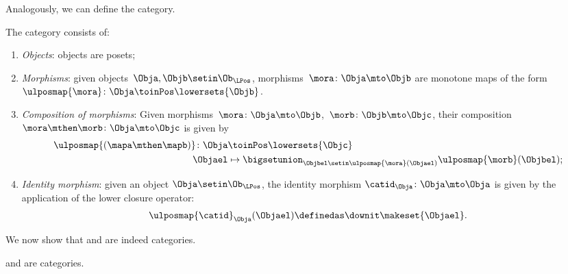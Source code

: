 Analogously, we can define the \LPos category.
\begin{definition}
    \label{def:lpos_cat}
    The category \LPos consists of:
    \begin{enumerate}
        \item \emph{Objects}: objects are posets;
        \item \emph{Morphisms}: given objects~$\Obja,\Objb\setin \Ob_{\LPos}$, morphisms~$\mora\colon \Obja\mto \Objb$ are monotone maps of the form~$\ulposmap{\mora} \colon \Obja \toinPos \lowersets{\Objb}$.
        \item \emph{Composition of morphisms}: Given morphisms~$\mora \colon \Obja \mto \Objb$,~$\morb \colon \Objb\mto \Objc$, their composition~$\mora\mthen \morb\colon \Obja\mto \Objc$ is given by
              \begin{equation}
                  \begin{aligned}
                      \ulposmap{(\mapa \mthen \mapb)} \colon \Obja & \toinPos \lowersets{\Objc} \\
                      \Objael                                      & \mapsto \bigsetunion_{\Objbel\setin \ulposmap{\mora} (\Objael)}\ulposmap{\morb}(\Objbel);
                  \end{aligned}
              \end{equation}
        \item \emph{Identity morphism}: given an object $\Obja\setin \Ob_{\LPos}$, the identity morphism $\catid_\Obja \colon \Obja \mto \Obja$ is given by the application of the lower closure operator:
              \begin{equation}
                  \ulposmap{\catid}_\Obja(\Objael)\definedas \downit\makeset{\Objael}.
              \end{equation}
    \end{enumerate}
\end{definition}

We now show that \UPos and \LPos are indeed categories.

\begin{lemma}
    \label{lem:upos_lpos_cats}
    \UPos and \LPos are categories.
\end{lemma}

